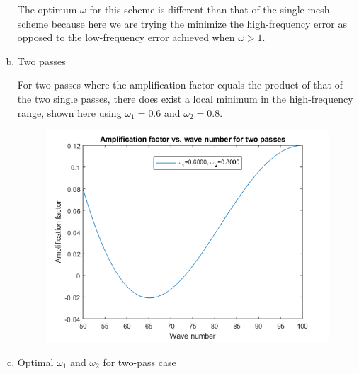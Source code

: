 \documentclass[12pt]{extarticle}
\begin{document}
\begin{enumerate}[(a)]
        The optimum $\omega$ for this scheme is different than that of the single-mesh scheme because here we are trying the minimize the high-frequency error as opposed to the low-frequency error achieved when $\omega > 1$.
        
        \item Two passes
        
        For two passes where the amplification factor equals the product of that of the two single passes, there does exist a local minimum in the high-frequency range, shown here using $\omega_1 = 0.6$ and $\omega_2 = 0.8$.
        
        \begin{figure}[ht]
            \centering
            \includegraphics[scale = 0.7]{doublepass_amp.png}
        \end{figure}
        
        \newpage
        \item Optimal $\omega_1$ and $\omega_2$ for two-pass case
        

\end{enumerate}
\end{document}
